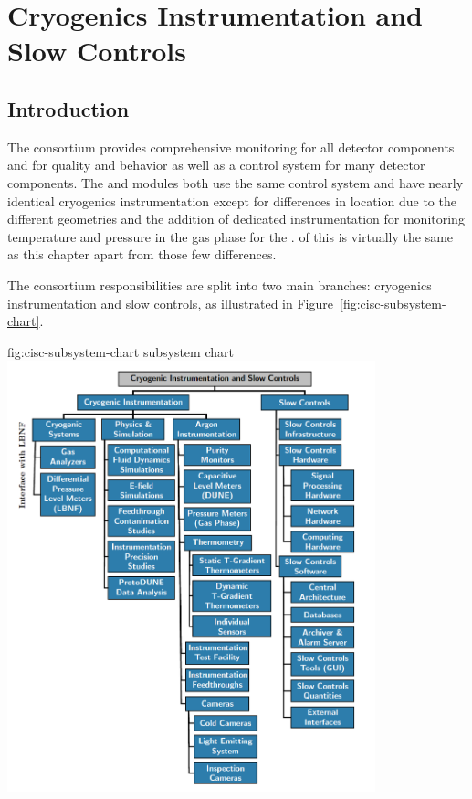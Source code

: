 \chapter{Cryogenics Instrumentation and Slow Controls}
\label{ch:sp-cisc}


\section{Introduction} 

The  consortium provides comprehensive monitoring for all detector  components and for  quality and behavior as well as a control system for many detector components.
The  and  modules both use the same control
system and have nearly identical cryogenics instrumentation except
for differences in location due to the different 
geometries and the addition of dedicated instrumentation for
monitoring temperature and pressure in the gas phase for the
.  \dpchcisc %
of this
 is virtually the same as this chapter apart from
those few differences.


The consortium responsibilities are split into 
two main branches: cryogenics instrumentation and slow controls, as illustrated in  Figure~\ref{fig:cisc-subsystem-chart}. %

\begin{dunefigure}{fig:cisc-subsystem-chart}
  { subsystem chart}
  \includegraphics[width=0.8\textwidth]{graphics/CISC_scope_SP_2019Apr15.png}
\end{dunefigure}


